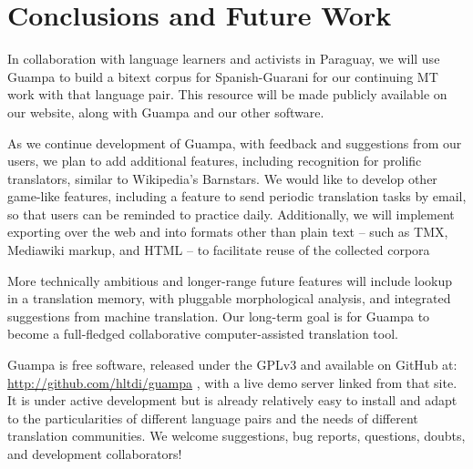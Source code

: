 \documentclass[10pt, a4paper]{article}
\begin{document}
\section{Conclusions and Future Work}
In collaboration with language learners and activists in Paraguay, we will use
Guampa to build a bitext corpus for Spanish-Guarani for our continuing MT
work with that language pair. This resource will be made publicly available on
our website, along with Guampa and our other software.

As we continue development of Guampa, with feedback and suggestions from our
users, we plan to add additional features, including recognition for prolific
translators, similar to Wikipedia's Barnstars. We would like to develop other
game-like features, including a feature to send periodic translation tasks by
email, so that users can be reminded to practice daily. Additionally, we will
implement exporting over the web and into formats other than plain text -- such
as TMX, Mediawiki markup, and HTML --  to facilitate reuse of the collected
corpora 

More technically ambitious and longer-range future features will include lookup
in a translation memory, with pluggable morphological analysis, and integrated
suggestions from machine translation. Our long-term goal is for Guampa to
become a full-fledged collaborative computer-assisted translation tool.

Guampa is free software, released under the GPLv3 and available on GitHub at:
\\
\url{http://github.com/hltdi/guampa} , with a live demo server linked from that
site. It is under active development but is already relatively easy to install
and adapt to the particularities of different language pairs and the needs of
different translation communities. We welcome suggestions, bug reports,
questions, doubts, and development collaborators!



\end{document}
